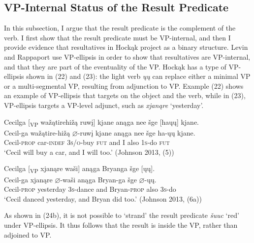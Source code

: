 \documentclass[output=paper]{LSP/langsci}
\begin{document}
\subsection{VP-Internal Status of the Result Predicate}

In this subsection, I argue that the result predicate is the complement of the verb. I first show that the result predicate must be VP-internal, and then I provide evidence that resultatives in Hockąk project as a binary structure. Levin and Rappaport \citet{Hovav1995} use VP-ellipsis in order to show that resultatives are VP-internal, and that they are part of the eventuality of the VP. Hockąk has a type of VP-ellipsis shown in (22) and (23): the light verb \textit{ųų} can replace either a minimal VP or a multi-segmental VP, resulting from adjunction to VP. Example (22) shows an example of VP-ellipsis that targets on the object and the verb, while in (23), VP-ellipsis targets a VP-level adjunct, such as \textit{xjanąre} `yesterday'.

\begin{exe}

\ex \glll Cecilga [\textsubscript{VP} wažątirehižą ruwį] kjane anąga nee šge [haųų] kjane.\\
Cecil-ga {} wažątire-hižą {$\varnothing$}-ruwį kjane anąga nee šge ha-ųų kjane.\\
Cecil-\textsc{prop} {} car-\textsc{indef} \textsc{3s/o}-buy \textsc{fut} and I also \textsc{1s}-do \textsc{fut}\\
\glt `Cecil will buy a car, and I will too.' (Johnson 2013, (5))

\ex \glll Cecilga [\textsubscript{VP} xjanąre waši] anąga Bryanga šge [ųų].\\
Cecil-ga {} xjanąre {$\varnothing$}-waši anąga Bryan-ga šge {$\varnothing$}-ųų.\\
Cecil-\textsc{prop} {} yesterday \textsc{3s}-dance and Bryan-\textsc{prop} also \textsc{3s}-do\\
\glt `Cecil danced yesterday, and Bryan did too.' (Johnson 2013, (6a))

\end{exe}

As shown in (24b), it is not possible to `strand' the result predicate \textit{šuuc} `red' under VP-ellipsis. It thus follows that the result is inside the VP, rather than adjoined to VP.
\end{document}
